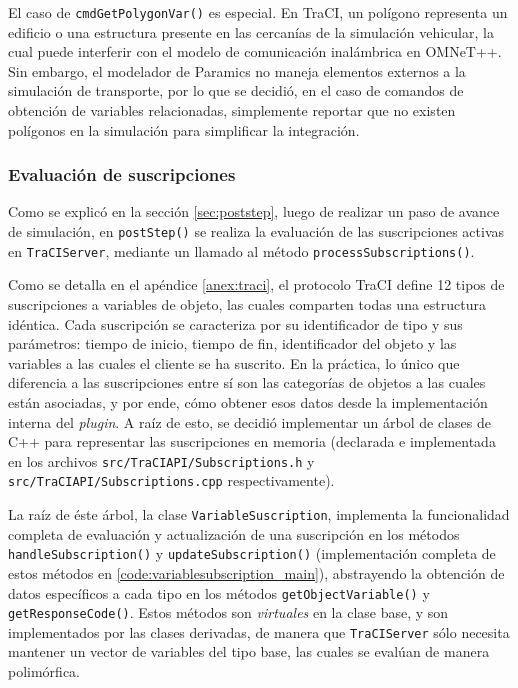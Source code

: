 

El caso de \texttt{cmdGetPolygonVar()} es especial. En TraCI, un polígono representa un edificio o una estructura presente en las cercanías de la simulación vehicular, la cual puede interferir con el modelo de comunicación inalámbrica en OMNeT++. Sin embargo, el modelador de Paramics no maneja elementos externos a la simulación de transporte, por lo que se decidió, en el caso de comandos de obtención de variables relacionadas, simplemente reportar que no existen polígonos en la simulación para simplificar la integración.


\subsubsection{Evaluación de suscripciones}\label{sec:subs}

Como se explicó en la sección \ref{sec:poststep}, luego de realizar un paso de avance de simulación, en \texttt{postStep()} se realiza la evaluación de las suscripciones activas en \texttt{TraCIServer}, mediante un llamado al método \texttt{processSubscriptions()}.

Como se detalla en el apéndice \ref{anex:traci}, el protocolo TraCI define 12 tipos de suscripciones a variables de objeto, las cuales comparten todas una estructura idéntica. Cada suscripción se caracteriza por su identificador de tipo y sus parámetros: tiempo de inicio, tiempo de fin, identificador del objeto y las variables a las cuales el cliente se ha suscrito. En la práctica, lo único que diferencia a las suscripciones entre sí son las categorías de objetos a las cuales están asociadas, y por ende, cómo obtener esos datos desde la implementación interna del \emph{plugin}. A raíz de esto, se decidió implementar un árbol de clases de C++ para representar las suscripciones en memoria (declarada e implementada en los archivos \texttt{src/TraCIAPI/Subscriptions.h} y \texttt{src/TraCIAPI/Subscriptions.cpp} respectivamente).

La raíz de éste árbol, la clase \texttt{VariableSuscription}, implementa la funcionalidad completa de evaluación y actualización de una suscripción en los métodos \texttt{handleSubscription()} y \texttt{updateSubscription()} (implementación completa de estos métodos en \ref{code:variablesubscription_main}), abstrayendo la obtención de datos específicos a cada tipo en los métodos \texttt{getObjectVariable()} y \texttt{getResponseCode()}. Estos métodos son \emph{virtuales} en la clase base, y son implementados por las clases derivadas, de manera que \texttt{TraCIServer} sólo necesita mantener un vector de variables del tipo base, las cuales se evalúan de manera polimórfica.

